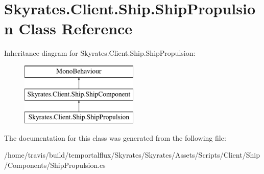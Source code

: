 \hypertarget{class_skyrates_1_1_client_1_1_ship_1_1_ship_propulsion}{\section{Skyrates.\-Client.\-Ship.\-Ship\-Propulsion Class Reference}
\label{class_skyrates_1_1_client_1_1_ship_1_1_ship_propulsion}
}
Inheritance diagram for Skyrates.\-Client.\-Ship.\-Ship\-Propulsion\-:\begin{figure}[H]
\begin{center}
\leavevmode
\includegraphics[height=3.000000cm]{class_skyrates_1_1_client_1_1_ship_1_1_ship_propulsion}
\end{center}
\end{figure}


The documentation for this class was generated from the following file\-:\begin{DoxyCompactItemize}
\item 
/home/travis/build/temportalflux/\-Skyrates/\-Skyrates/\-Assets/\-Scripts/\-Client/\-Ship/\-Components/Ship\-Propulsion.\-cs\end{DoxyCompactItemize}

